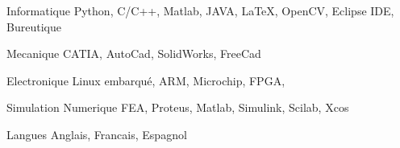 

\begin{cvskills}

  \cvskill
    {Informatique} %
    {Python, C/C++, Matlab, JAVA, LaTeX, OpenCV, Eclipse IDE, Bureutique } %

  \cvskill
    {Mecanique} %
    {CATIA, AutoCad, SolidWorks, FreeCad} %

\cvskill
{Electronique} %
{Linux embarqué, ARM, Microchip, FPGA, } %

\cvskill
{Simulation Numerique} %
{FEA, Proteus, Matlab, Simulink, Scilab, Xcos} %

  \cvskill
    {Langues} %
    {Anglais, Francais, Espagnol} %

\end{cvskills}
